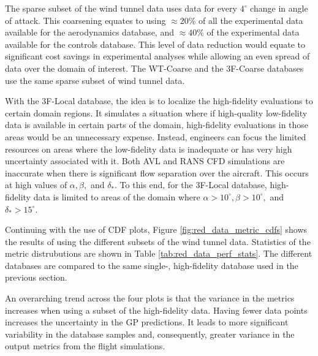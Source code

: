 The sparse subset of the wind tunnel data uses data for every $4^\circ$ change in angle of attack.
This coarsening equates to using $\approx20\%$ of all the experimental data available for the aerodynamics database, and $\approx40\%$ of the experimental data available for the controls database. 
This level of data reduction would equate to significant cost savings in experimental analyses while allowing an even spread of data over the domain of interest. 
The WT-Coarse and the 3F-Coarse databases use the same sparse subset of wind tunnel data.

With the 3F-Local database, the idea is to localize the high-fidelity evaluations to certain domain regions.
It simulates a situation where if high-quality low-fidelity data is available in certain parts of the domain, high-fidelity evaluations in those areas would be an unnecessary expense. 
Instead, engineers can focus the limited resources on areas where the low-fidelity data is inadequate or has very high uncertainty associated with it. 
Both AVL and RANS CFD simulations are inaccurate when there is significant flow separation over the aircraft. 
This occurs at high values of $\alpha, \beta,$ and $\delta_*$.
To this end, for the 3F-Local database, high-fidelity data is limited to areas of the domain where $\alpha > 10^\circ, \beta > 10^\circ,$ and $\delta_* > 15^\circ$.

Continuing with the use of CDF plots, Figure \ref{fig:red_data_metric_cdfs} shows the results of using the different subsets of the wind tunnel data.
Statistics of the metric distrubutions are shown in Table \ref{tab:red_data_perf_stats}.
The different databases are compared to the same single-, high-fidelity database used in the previous section.

An overarching trend across the four plots is that the variance in the metrics increases when using a subset of the high-fidelity data. 
Having fewer data points increases the uncertainty in the GP predictions.
It leads to more significant variability in the database samples and, consequently, greater variance in the output metrics from the flight simulations. 

